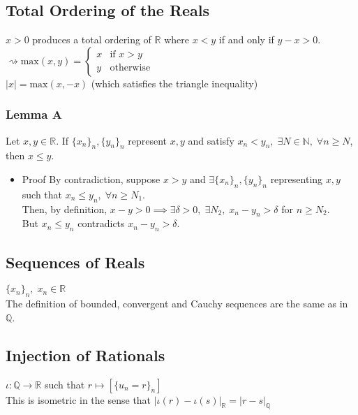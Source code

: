 \documentclass[11pt]{article}
\newcommand{\0}{\emptyset}
\newcommand{\N}{\mathbb{N}}
\newcommand{\Q}{\mathbb{Q}}
\newcommand{\R}{\mathbb{R}}
\begin{document}
\subsection*{Total Ordering of the Reals}
\label{sec:org98dad57}
\(x>0\) produces a total ordering of \(\R\) where \(x<y\) if and only if \(y-x>0\).\\[0pt]
\(\rightsquigarrow\text{max}(x,y)=\begin{cases}x & \text{if }x>y \\ y & \text{otherwise}\end{cases}\)\\[0pt]
\(|x|=\text{max}(x,-x)\) (which satisfies the triangle inequality)\\[0pt]
\subsubsection*{Lemma A}
\label{sec:org114f897}
Let \(x,y\in\R\). If \(\{x_{n}\}_{n},\{y_{n}\}_{n}\) represent \(x,y\) and satisfy \(x_{n}<y_{n},\;\exists N\in\N,\;\forall n\geq N\), then \(x\leq y\).\\[0pt]
\begin{itemize}
\item Proof
\label{sec:orgab42e3a}
By contradiction, suppose \(x>y\) and \(\exists \{x_{n}\}_{n},\{y_{n}\}_{n}\) representing \(x,y\) such that \(x_{n}\leq y_{n},\;\forall n\geq N_{1}\).\\[0pt]
Then, by definition, \(x-y>0\implies\exists\delta>0,\;\exists N_{2},\;x_{n}-y_{n}>\delta\) for \(n\geq N_{2}\).\\[0pt]
But \(x_{n}\leq y_{n}\) contradicts \(x_{n}-y_{n}>\delta\).\\[0pt]
\end{itemize}
\subsection*{Sequences of Reals}
\label{sec:orgf6ed14c}
\(\{x_{n}\}_{n},\;x_{n}\in\R\)\\[0pt]
The definition of bounded, convergent and Cauchy sequences are the same as in \(\Q\).\\[0pt]
\subsection*{Injection of Rationals}
\label{sec:org53930b6}
\(\iota:\Q\to\R\) such that \(r\mapsto[\{u_{n}=r\}_{n}]\)\\[0pt]
This is isometric in the sense that \(|\iota(r)-\iota(s)|_{\R}=|r-s|_{\Q}\)\\[0pt]
\end{document}
